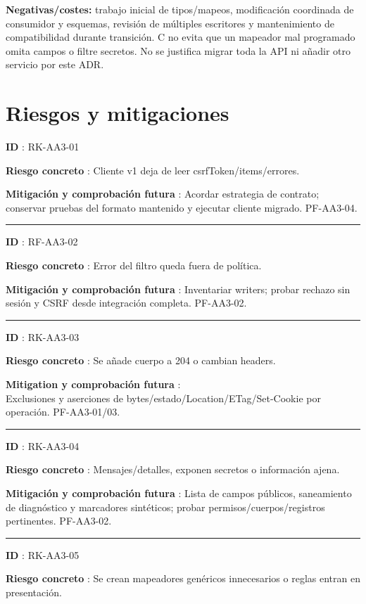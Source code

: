 \documentclass[12pt,a4paper]{report}
\begin{document}
\textbf{Negativas/costes:} trabajo inicial de tipos/mapeos, modificación
coordinada de consumidor y esquemas, revisión de múltiples escritores y
mantenimiento de compatibilidad durante transición. C no evita que un
mapeador mal programado omita campos o filtre secretos. No se justifica
migrar toda la API ni añadir otro servicio por este ADR.

\section{Riesgos y mitigaciones}\label{adr-riesgos-y-mitigaciones}

\textbf{ID }: RK-AA3-01

\textbf{Riesgo concreto }: Cliente v1 deja de leer
csrfToken/items/errores.

\textbf{Mitigación y comprobación futura }: Acordar estrategia de
contrato; conservar pruebas del formato mantenido y ejecutar cliente
migrado. PF-AA3-04.

\medskip\hrule\medskip

\textbf{ID }: RF-AA3-02

\textbf{Riesgo concreto }: Error del filtro queda fuera de política.

\textbf{Mitigación y comprobación futura }: Inventariar writers; probar
rechazo sin sesión y CSRF desde integración completa. PF-AA3-02.

\medskip\hrule\medskip

\textbf{ID }: RK-AA3-03

\textbf{Riesgo concreto }: Se añade cuerpo a 204 o cambian headers.

\textbf{Mitigation y comprobación futura }: \\
Exclusiones y aserciones de bytes/estado/Location/ETag/Set-Cookie por operación. PF-AA3-01/03.

\medskip\hrule\medskip

\textbf{ID }: RK-AA3-04

\textbf{Riesgo concreto }: Mensajes/detalles, exponen secretos o
información ajena.

\textbf{Mitigación y comprobación futura }: Lista de campos públicos,
saneamiento de diagnóstico y marcadores sintéticos; probar
permisos/cuerpos/registros pertinentes. PF-AA3-02.

\medskip\hrule\medskip

\textbf{ID }: RK-AA3-05

\textbf{Riesgo concreto }: Se crean mapeadores genéricos innecesarios o
reglas entran en presentación.
\end{document}
